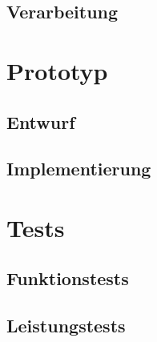 \subsection{Verarbeitung}


\section{Prototyp}

\subsection{Entwurf}

\subsection{Implementierung}


\section{Tests}

\subsection{Funktionstests}

\subsection{Leistungstests}
